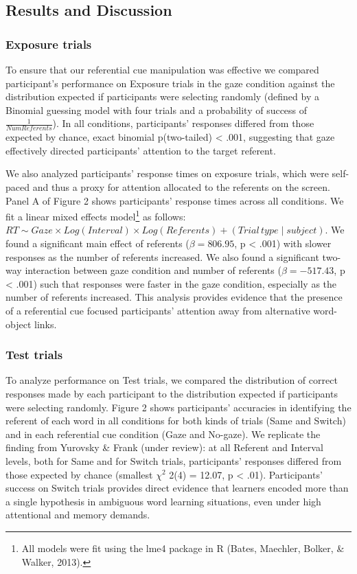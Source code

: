 \documentclass[12pt,]{article}
\let\rmarkdownfootnote\footnote%
\def\footnote{\protect\rmarkdownfootnote}
\begin{document}
\subsection{Results and Discussion}\label{results-and-discussion}

\subsubsection{Exposure trials}\label{exposure-trials}

To ensure that our referential cue manipulation was effective we
compared participant's performance on Exposure trials in the gaze
condition against the distribution expected if participants were
selecting randomly (defined by a Binomial guessing model with four
trials and a probability of success of \(\frac{1}{Num Referents}\)). In
all conditions, participants' responses differed from those expected by
chance, exact binomial p(two-tailed) \textless{} .001, suggesting that
gaze effectively directed participants' attention to the target
referent.

We also analyzed participants' response times on exposure trials, which
were self-paced and thus a proxy for attention allocated to the
referents on the screen. Panel A of Figure 2 shows participants'
response times across all conditions. We fit a linear mixed effects
model\footnote{All models were fit using the lme4 package in R (Bates,
  Maechler, Bolker, \& Walker, 2013).} as follows:
\(RT \sim Gaze \times Log(Interval) \times Log(Referents) + (Trial \, type \mid subject)\).
We found a significant main effect of referents (\(\beta = 806.95\), p
\textless{} .001) with slower responses as the number of referents
increased. We also found a significant two-way interaction between gaze
condition and number of referents (\(\beta = -517.43\), p \textless{}
.001) such that responses were faster in the gaze condition, especially
as the number of referents increased. This analysis provides evidence
that the presence of a referential cue focused participants' attention
away from alternative word-object links.

\subsubsection{Test trials}\label{test-trials}

To analyze performance on Test trials, we compared the distribution of
correct responses made by each participant to the distribution expected
if participants were selecting randomly. Figure 2 shows participants'
accuracies in identifying the referent of each word in all conditions
for both kinds of trials (Same and Switch) and in each referential cue
condition (Gaze and No-gaze). We replicate the finding from Yurovsky \&
Frank (under review): at all Referent and Interval levels, both for Same
and for Switch trials, participants' responses differed from those
expected by chance (smallest \(\chi^2\) 2(4) = 12.07, p \textless{}
.01). Participants' success on Switch trials provides direct evidence
that learners encoded more than a single hypothesis in ambiguous word
learning situations, even under high attentional and memory demands.
\end{document}
